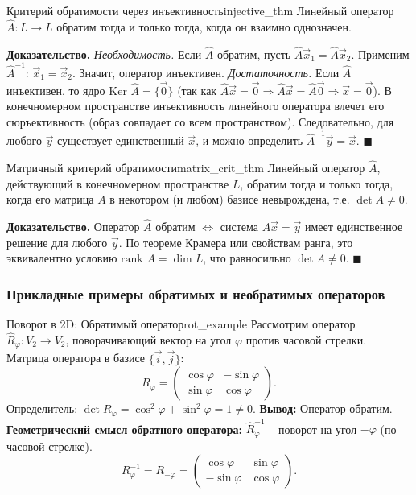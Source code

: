 \documentclass[12pt,a4paper]{article}
\newenvironment{myproof}{\noindent\textbf{Доказательство.}}{\hfill$\blacksquare$}
\begin{document}
\begin{theorem}{Критерий обратимости через инъективность}{injective_thm}
  Линейный оператор $\hat{A}: L \to L$ обратим тогда и только тогда,
  когда он взаимно однозначен.
\end{theorem}

\begin{myproof}
  \textit{Необходимость.} Если $\hat{A}$ обратим, пусть
  $\hat{A}\vec{x}_1 = \hat{A}\vec{x}_2$. Применим $\hat{A}^{-1}$:
  $\vec{x}_1 = \vec{x}_2$. Значит, оператор инъективен.
  \textit{Достаточность.} Если $\hat{A}$ инъективен, то ядро
  $\text{Ker }\hat{A} = \{\vec{0}\}$ (так как $\hat{A}\vec{x}=\vec{0}
    \Rightarrow \hat{A}\vec{x}=\hat{A}\vec{0} \Rightarrow
  \vec{x}=\vec{0}$). В конечномерном пространстве инъективность
  линейного оператора влечет его сюръективность (образ совпадает со
  всем пространством). Следовательно, для любого $\vec{y}$ существует
  единственный $\vec{x}$, и можно определить $\hat{A}^{-1}\vec{y} = \vec{x}$.
\end{myproof}

\begin{theorem}{Матричный критерий обратимости}{matrix_crit_thm}
  Линейный оператор $\hat{A}$, действующий в конечномерном
  пространстве $L$, обратим тогда и только тогда, когда его матрица
  $A$ в некотором (и любом) базисе невырождена, т.е. $\det A \neq 0$.
\end{theorem}

\begin{myproof}
  Оператор $\hat{A}$ обратим $\iff$ система $A\vec{x} = \vec{y}$
  имеет единственное решение для любого $\vec{y}$. По теореме Крамера
  или свойствам ранга, это эквивалентно условию $\text{rank } A =
  \dim L$, что равносильно $\det A \neq 0$.
\end{myproof}

\subsubsection*{Прикладные примеры обратимых и необратимых операторов}

\begin{definition}{Поворот в 2D: Обратимый оператор}{rot_example}
  Рассмотрим оператор $\hat{R}_\varphi: V_2 \to V_2$, поворачивающий
  вектор на угол $\varphi$ против часовой стрелки.
  Матрица оператора в базисе $\{\vec{i}, \vec{j}\}$:
  \[
    R_\varphi =
    \begin{pmatrix} \cos\varphi & -\sin\varphi \\ \sin\varphi & \cos\varphi
    \end{pmatrix}.
  \]
  Определитель: $\det R_\varphi = \cos^2\varphi + \sin^2\varphi = 1 \neq 0$.
  \textbf{Вывод:} Оператор обратим.
  \textbf{Геометрический смысл обратного оператора:}
  $\hat{R}_\varphi^{-1}$ -- поворот на угол $-\varphi$ (по часовой стрелке).
  \[
    R_\varphi^{-1} = R_{-\varphi} =
    \begin{pmatrix} \cos\varphi & \sin\varphi \\ -\sin\varphi & \cos\varphi
    \end{pmatrix}.
  \]
\end{definition}
\end{document}
